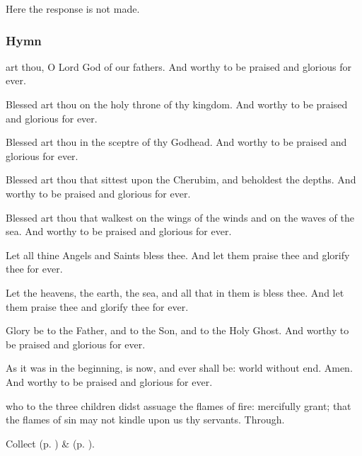 \begin{rubric}
    Here the response  is not made.
\end{rubric}

\subsubsection{Hymn}
 art thou, O Lord God of our fathers. And worthy to be praised and glorious for ever.\par
{}

Blessed art thou on the holy throne of thy kingdom. And worthy to be praised and glorious for ever.

Blessed art thou in the sceptre of thy Godhead. And worthy to be praised and glorious for ever.

Blessed art thou that sittest upon the Cherubim, and beholdest the depths. And worthy to be praised and glorious for ever.

Blessed art thou that walkest on the wings of the winds and on the waves of the sea. And worthy to be praised and glorious for ever.

Let all thine Angels and Saints bless thee. And let them praise thee and glorify thee for ever.

Let the heavens, the earth, the sea, and all that in them is bless thee. And let them praise thee and glorify thee for ever.

Glory be to the Father, and to the Son, and to the Holy Ghost. And worthy to be praised and glorious for ever.

As it was in the beginning, is now, and ever shall be: world without end. Amen. And worthy to be praised and glorious for ever.\\


{} who to the three children didst assuage the flames of fire: mercifully grant; that the flames of sin may not kindle upon us thy servants. Through.

\begin{rubric}
     Collect  (p. \pageref{AshWednesdayMassCollect}) \&   (p. \pageref{SPLivingDeparted}).
\end{rubric}

